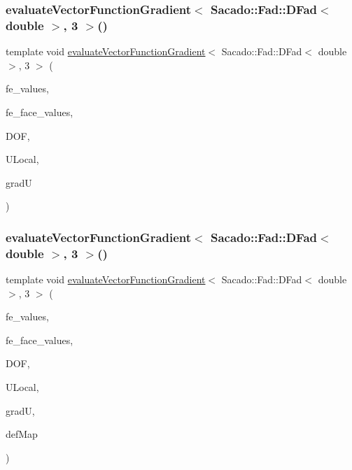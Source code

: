 \subsubsection{\texorpdfstring{evaluateVectorFunctionGradient$<$ Sacado::Fad::DFad$<$ double $>$, 3 $>$()}{evaluateVectorFunctionGradient< Sacado::Fad::DFad< double >, 3 >()}\hspace{0.1cm}{\footnotesize\ttfamily [3/4]}}
{\footnotesize\ttfamily template void \mbox{\hyperlink{group___evaluation_functions_ga9608539d601a91aff1ba01ccc720fbe0}{evaluate\+Vector\+Function\+Gradient}}$<$ Sacado\+::\+Fad\+::\+D\+Fad$<$ double $>$, 3 $>$ (\begin{DoxyParamCaption}\item[{const F\+E\+Values$<$ 3 $>$ \&}]{fe\+\_\+values,  }\item[{const F\+E\+Face\+Values$<$ 3 $>$ \&}]{fe\+\_\+face\+\_\+values,  }\item[{unsigned int}]{D\+OF,  }\item[{Table$<$ 1, Sacado\+::\+Fad\+::\+D\+Fad$<$ double $>$$>$ \&}]{U\+Local,  }\item[{Table$<$ 3, Sacado\+::\+Fad\+::\+D\+Fad$<$ double $>$$>$ \&}]{gradU }\end{DoxyParamCaption})}

\mbox{\label{function_evaluations_8cc_ab4669516f8f9436b73dedeb24cc0ffff}} 
\subsubsection{\texorpdfstring{evaluateVectorFunctionGradient$<$ Sacado::Fad::DFad$<$ double $>$, 3 $>$()}{evaluateVectorFunctionGradient< Sacado::Fad::DFad< double >, 3 >()}\hspace{0.1cm}{\footnotesize\ttfamily [4/4]}}
{\footnotesize\ttfamily template void \mbox{\hyperlink{group___evaluation_functions_ga9608539d601a91aff1ba01ccc720fbe0}{evaluate\+Vector\+Function\+Gradient}}$<$ Sacado\+::\+Fad\+::\+D\+Fad$<$ double $>$, 3 $>$ (\begin{DoxyParamCaption}\item[{const F\+E\+Values$<$ 3 $>$ \&}]{fe\+\_\+values,  }\item[{const F\+E\+Face\+Values$<$ 3 $>$ \&}]{fe\+\_\+face\+\_\+values,  }\item[{unsigned int}]{D\+OF,  }\item[{Table$<$ 1, Sacado\+::\+Fad\+::\+D\+Fad$<$ double $>$$>$ \&}]{U\+Local,  }\item[{Table$<$ 3, Sacado\+::\+Fad\+::\+D\+Fad$<$ double $>$$>$ \&}]{gradU,  }\item[{\mbox{\hyperlink{structdeformation_map}{deformation\+Map}}$<$ Sacado\+::\+Fad\+::\+D\+Fad$<$ double $>$, 3 $>$ \&}]{def\+Map }\end{DoxyParamCaption})}

